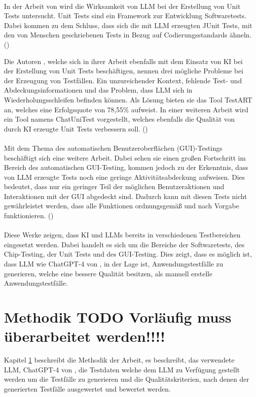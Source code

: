 \documentclass[12pt,toc=bib,toc=listof]{scrreprt}
\begin{document}
\\
In der Arbeit von \textcite{Ouédraogo2024} wird die Wirksamkeit von LLM bei der Erstellung von Unit Tests untersucht. Unit Tests sind ein Framework zur Entwicklung Softwaretests. Dabei kommen \textcite{Ouédraogo2024} zu dem Schluss, dass sich die mit LLM erzeugten JUnit Tests, mit den von Menschen geschriebenen Tests in Bezug auf Codierungsstandards ähneln. (\cite{Ouédraogo2024})\\
\newpage

\noindent Die Autoren \textcite{Gu2024}, welche sich in ihrer Arbeit ebenfalls mit dem Einsatz von KI bei der Erstellung von Unit Tests beschäftigen, nennen drei mögliche Probleme bei der Erzeugung von Testfällen.
Ein unzureichender Kontext, fehlende Test- und Abdeckungsinformationen und das Problem, dass LLM sich in Wiederholungsschleifen befinden können. Als Lösung bieten sie das Tool TestART an, welches eine Erfolgsquote von 78,55\% aufweist. In einer weiteren Arbeit wird ein Tool namens ChatUniTest vorgestellt, welches ebenfalls die Qualität von durch KI erzeugte Unit Tests verbessern soll. (\cite{Gu2024})\\
\\
Mit dem Thema des automatischen Benutzeroberflächen (GUI)-Testings beschäftigt sich eine weitere Arbeit. Dabei sehen sie einen großen Fortschritt im Bereich des automatischen GUI-Testing, kommen jedoch zu der Erkenntnis, dass von LLM erzeugte Tests noch eine geringe Aktivitätsabdeckung aufweisen. Dies bedeutet, dass nur ein geringer Teil der möglichen Benutzeraktionen und Interaktionen mit der GUI abgedeckt sind. Dadurch kann mit diesen Tests nicht gewährleistet werden, dass alle Funktionen ordnungsgemäß und nach Vorgabe funktionieren. (\cite{Liu2024})\\
\\
Diese Werke zeigen, dass KI und LLMs bereits in verschiedenen Testbereichen eingesetzt werden. Dabei handelt es sich um die Bereiche der Softwaretests, des Chip-Testing, der Unit Tests und des GUI-Testing. Dies zeigt, dass es möglich ist, dass LLM wie ChatGPT-4 von \textcite{OpenAI2025}, in der Lage ist, Anwendungstestfälle zu generieren, welche eine bessere Qualität besitzen, als manuell erstelle Anwendungstestfälle.

\chapter{Methodik TODO Vorläufig muss überarbeitet werden!!!!} %
\label{sec:methodik}
Kapitel \ref{sec:methodik} beschreibt die Methodik der Arbeit, es beschreibt, das verwendete LLM, ChatGPT-4 von \textcite{OpenAI2025}, die Testdaten welche dem LLM zu Verfügung gestellt werden um die Testfälle zu generieren und die Qualitätskriterien, nach denen der generierten Testfälle ausgewertet und bewertet werden.
\end{document}
